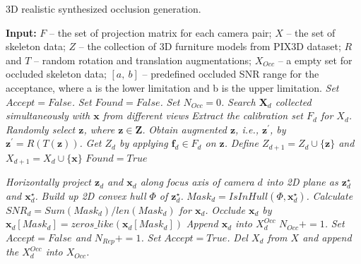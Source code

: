 \documentclass[lettersize,journal]{IEEEtran}
\begin{document}
\begin{algorithm}[t]
    \caption{3D realistic synthesized occlusion generation.}
    \label{algorithm}
    \renewcommand{\thealgorithm}{}
    \begin{algorithmic}[1]
        \small{
            \STATEx \textbf{Input:} $F$ -- the set of projection matrix for each camera pair; $X$ -- the set of skeleton data; $Z$ -- the collection of 3D furniture models from PIX3D dataset; $R$ and $T$ -- random rotation and translation augmentations; $X_{Occ}$ -- a empty set for occluded skeleton data; $[a,~b]$ -- predefined occluded SNR range for the acceptance, where a is the lower limitation and b is the upper limitation.
        }
        \STATE \textit{Set $Accept = False$.}
        \STATE \textit{Set $Found = False$.}
        \STATE \textit{Set $N_{Occ} = 0$.}
        \STATE {}
        \STATE
        \textit{Search $\mathbf{X}_{d}$ collected simultaneously with $\mathbf{x}$ from different views}
        \STATE \textit{Extract the calibration set $F_{d}$ for $X_{d}$.}
        \STATE \textit{Randomly select $\mathbf{z}$, where $\mathbf{z} \in \mathbf{Z}$.} 
        \STATE \textit{Obtain augmented $\mathbf{z}$, i.e., $\mathbf{z}^{'}$, by $\mathbf{z}^{'} = R(T(\mathbf{z}))$.} 
        \STATE \textit{Get $Z_{d}$ by applying $\mathbf{f}_d \in F_{d}$ on $\mathbf{z}$.}
        \STATE \textit{Define $Z_{d+1} = Z_d \cup \{\textbf{z}\}$ and $X_{d+1} = X_d \cup \{\mathbf{x}\}$}
            \STATE $Found = True$
        \ENDIF
        \ENDWHILE

        \STATE \textit{Horizontally project $\mathbf{z}_{d}$ and $\mathbf{x}_d$ along focus axis of camera $d$ into 2D plane as $\mathbf{z}^{\star}_{d}$ and $\mathbf{x}^{\star}_d$.}
        \STATE \textit{Build up 2D convex hull $\Phi$ of $\mathbf{z}^{\star}_{d}$.}
        \State \textit{$Mask_{d} = IsInHull(\Phi, \mathbf{x}^{\star}_d)$.}
        \State \textit{Calculate $SNR_{d} =Sum(Mask_{d})/len(Mask_{d})$ for $\mathbf{x}_d$.}
        \State \textit{Occlude $\mathbf{x}_{d}$ by $\mathbf{x}_d[Mask_{d}] = zeros\_like(\mathbf{x}_d[Mask_{d}])$}
        \State \textit{Append $\mathbf{x}_d$ into $X_{d}^{Occ}$}
        \STATE \textit{$N_{Occ} += 1$.}
        \ENDIF
        \ENDFOR
        \STATE \textit{Set $Accept = False$ and $N_{Rep} += 1$.}
        \ELSE
        \STATE \textit{Set $Accept = True$.}
        \STATE \textit{Del $X_d$ from $X$ and append the $X_{d}^{Occ}$ into $X_{Occ}$.}
        \ENDIF
        \ENDWHILE
        \ENDFOR
    \end{algorithmic}
\end{algorithm}
\end{document}
